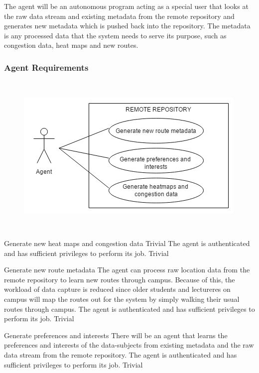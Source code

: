The agent will be an autonomous program acting as a special user that looks at the raw data stream and existing metadata from the remote repository and generates new metadata which is pushed back into the repository. The metadata is any processed data that the system needs to serve its purpose, such as congestion data, heat maps and new routes.

\subsubsection{Agent Requirements}\mbox{}\\
\begin{figure} 
  \includegraphics[width=\textwidth]{diagrams/Specific_Requirements/Agent_Use_Case.png}
\end{figure}

\\
\bigskip

\FuncReq
{Generate new heat maps and congestion data}
{Trivial}
{The agent is authenticated and has sufficient privileges to perform its job.}
{Trivial}

\FuncReq
{Generate new route metadata}
{The agent can process raw location data from the remote repository to learn new routes through campus. Because of this, the workload of data capture is reduced since older students and lectureres on campus will map the routes out for the system by simply walking their usual routes through campus.}
{The agent is authenticated and has sufficient privileges to perform its job.}
{Trivial}

\FuncReq
{Generate preferences and interests}
{There will be an agent that learns the preferences and interests of the data-subjects from existing metadata and the raw data stream from the remote repository.}
{The agent is authenticated and has sufficient privileges to perform its job.}
{Trivial}
 
